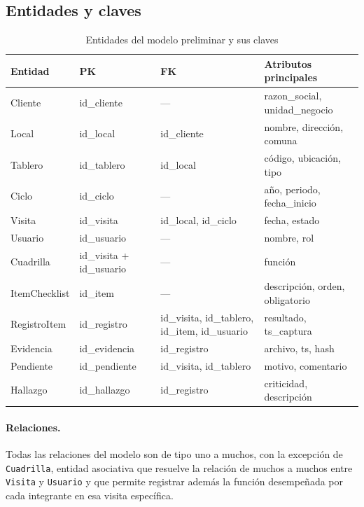 \documentclass[10pt,letterpaper]{article}
\begin{document}
\clearpage

\subsection{Entidades y claves}

\begin{table}[H]
\centering
\small
\begin{tabular}{@{}p{2.4cm}p{2.8cm}p{3.2cm}p{5.6cm}@{}}
\toprule
\textbf{Entidad} & \textbf{PK} & \textbf{FK} & \textbf{Atributos principales} \\
\midrule
Cliente & id\_cliente & --- & razon\_social, unidad\_negocio \\
Local & id\_local & id\_cliente & nombre, dirección, comuna \\
Tablero & id\_tablero & id\_local & código, ubicación, tipo \\
Ciclo & id\_ciclo & --- & año, periodo, fecha\_inicio \\
Visita & id\_visita & id\_local, id\_ciclo & fecha, estado \\
Usuario & id\_usuario & --- & nombre, rol \\
Cuadrilla & id\_visita + id\_usuario & --- & función \\
ItemChecklist & id\_item & --- & descripción, orden, obligatorio \\
RegistroItem & id\_registro & id\_visita, id\_tablero, id\_item, id\_usuario & resultado, ts\_captura \\
Evidencia & id\_evidencia & id\_registro & archivo, ts, hash \\
Pendiente & id\_pendiente & id\_visita, id\_tablero & motivo, comentario \\
Hallazgo & id\_hallazgo & id\_registro & criticidad, descripción \\
\bottomrule
\end{tabular}
\caption{Entidades del modelo preliminar y sus claves}
\end{table}

\paragraph{Relaciones.} Todas las relaciones del modelo son de tipo uno a muchos, con
la excepción de \texttt{Cuadrilla}, entidad asociativa que resuelve la relación de
muchos a muchos entre \texttt{Visita} y \texttt{Usuario} y que permite registrar
además la función desempeñada por cada integrante en esa visita específica.
\end{document}
